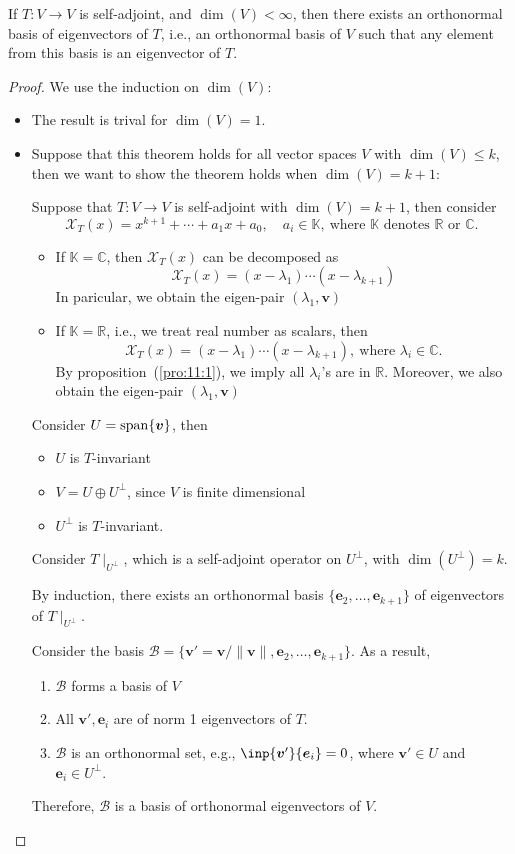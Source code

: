 \begin{theorem}\label{the:11:1}
If $T:V\to V$ is self-adjoint, and $\dim(V)<\infty$, then there exists an orthonormal basis of eigenvectors of $T$, i.e., an orthonormal basis of $V$ such that any element from this basis is an eigenvector of $T$.
\end{theorem}
\begin{proof}
We use the induction on $\dim(V)$:
\begin{itemize}
\item
The result is trival for $\dim(V)=1$.
\item
Suppose that this theorem holds for all vector spaces $V$ with $\dim(V)\le k$, then we want to show the theorem holds when $\dim(V)=k+1$:

Suppose that $T:V\to V$ is self-adjoint with $\dim(V)=k+1$, then consider 
\[
\mathcal{X}_T(x)=x^{k+1}+\cdots+a_1x+a_0,\quad a_i\in\mathbb{K},\ \text{where $\mathbb{K}$ denotes $\mathbb{R}$ or $\mathbb{C}$.}
\]
\begin{itemize}
\item
If $\mathbb{K}=\mathbb{C}$, then $\mathcal{X}_T(x)$ can be decomposed as
\[
\mathcal{X}_T(x)=(x-\lambda_1)\cdots(x-\lambda_{k+1})
\]
In paricular, we obtain the eigen-pair $(\lambda_1,\bm v)$
\item
If $\mathbb{K}=\mathbb{R}$, i.e., we treat real number as scalars, then
\[
\mathcal{X}_T(x)=(x-\lambda_1)\cdots(x-\lambda_{k+1}),\
\text{where $\lambda_i\in\mathbb{C}$}.
\]
By proposition~(\ref{pro:11:1}), we imply all $\lambda_i$'s are in $\mathbb{R}$.
Moreover, we also obtain the eigen-pair $(\lambda_1,\bm v)$
\end{itemize}

Consider $U=\operatorname{span}\{\bm v\}$, then
\begin{itemize}
\item
$U$ is $T$-invariant
\item
$V=U\oplus U^\perp$, since $V$ is finite dimensional
\item
$U^\perp$ is $T$-invariant.
\end{itemize}
Consider $T\mid_{U^\perp}$, which is a self-adjoint operator on $U^\perp$, with $\dim(U^\perp)=k$.

By induction, there exists an orthonormal basis $\{\bm e_2,\dots,\bm e_{k+1}\}$ of eigenvectors of $T\mid_{U^\perp}$.

Consider the basis $\mathcal{B}=\{\bm v'=\bm v/\|\bm v\|,\bm e_2,\dots,\bm e_{k+1}\}$. As a result,
\begin{enumerate}
\item
$\mathcal{B}$ forms a basis of $V$
\item
All $\bm v',\bm e_i$ are of norm 1 eigenvectors of $T$.
\item
$\mathcal{B}$ is an orthonormal set, e.g., $\inp{\bm v'}{\bm e_i}=0$, where $\bm v'\in U$ and $\bm e_i\in U^\perp$.
\end{enumerate}
Therefore, $\mathcal{B}$ is a basis of orthonormal eigenvectors of $V$.
\end{itemize}
\end{proof}

